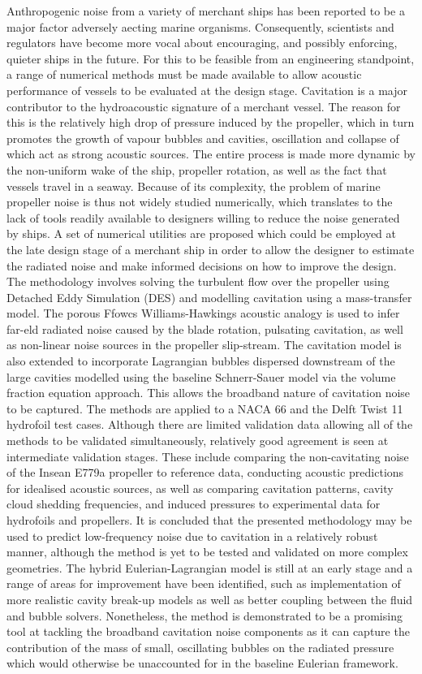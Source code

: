 \documentclass[a4paper,10pt]{article}
\begin{document}
	Anthropogenic noise from a variety of merchant ships has been reported to be a major factor adversely aecting marine organisms. Consequently, scientists and regulators have become more vocal about encouraging, and possibly enforcing, quieter ships in the future. For this to be feasible from an engineering standpoint, a range of numerical methods must be made available to allow acoustic performance of vessels to be evaluated at the design stage. Cavitation is a major contributor to the hydroacoustic signature of a merchant vessel. The reason for this is the relatively high drop of pressure induced by the propeller, which in turn promotes the growth of vapour bubbles and cavities, oscillation and collapse of which act as strong acoustic sources. The entire process is made more dynamic by the non-uniform wake of the ship, propeller rotation, as well as the fact that vessels travel in a seaway. Because of its complexity, the problem of marine propeller noise is thus not widely studied numerically, which translates to the lack of tools readily available to designers willing to reduce the noise generated by ships. A set of numerical utilities are proposed which could be employed at the late design stage of a merchant ship in order to allow the designer to estimate the radiated noise and make informed decisions on how to improve the design. The methodology involves solving the turbulent flow over the propeller using Detached Eddy Simulation (DES) and modelling cavitation using a mass-transfer model. The porous Ffowcs Williams-Hawkings acoustic analogy is used to infer far-eld radiated noise caused by the blade rotation, pulsating cavitation, as well as non-linear noise sources in the propeller slip-stream. The cavitation model is also extended to incorporate Lagrangian bubbles dispersed downstream of the large cavities modelled using the baseline Schnerr-Sauer model via the volume fraction equation approach. This allows the broadband nature of cavitation noise to be captured. The methods are applied to a NACA 66 and the Delft Twist 11 hydrofoil test cases. Although there are limited validation data allowing all of the methods to be validated simultaneously, relatively good agreement is seen at intermediate validation stages. These include comparing the non-cavitating noise of the Insean E779a propeller to reference data, conducting acoustic predictions for idealised acoustic sources, as well as comparing cavitation patterns, cavity cloud shedding frequencies, and induced pressures to experimental data for hydrofoils and propellers. It is concluded that the presented methodology may be used to predict low-frequency noise due to cavitation in a relatively robust manner, although the method is yet to be tested and validated on more complex geometries. The hybrid Eulerian-Lagrangian model is still at an early stage and a range of areas for improvement have been identified, such as implementation of more realistic cavity break-up models as well as better coupling between the fluid and bubble solvers. Nonetheless, the method is demonstrated to be a promising tool at tackling the broadband cavitation noise components as it can capture the contribution of the mass of small, oscillating bubbles on the radiated pressure which would otherwise be unaccounted for in the baseline Eulerian framework.
\end{document}

